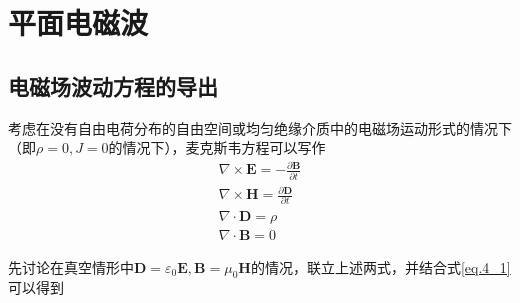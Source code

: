 \section{平面电磁波}
    \subsection{电磁场波动方程的导出}
        考虑在没有自由电荷分布的自由空间或均匀绝缘介质中的电磁场运动形式的情况下（即$\rho=0,J=0$的情况下），麦克斯韦方程可以写作
        \begin{equation}
            \label{eq.4_1}
            \begin{gathered}
            \nabla \times \boldsymbol{E}=-\frac{\partial \mathbf{B}}{\partial t} \\
            \nabla \times \mathbf{H}=\frac{\partial \mathbf{D}}{\partial t} \\
            \nabla \cdot \boldsymbol{D}=\rho \\
            \nabla \cdot \mathbf{B}=0
            \end{gathered}
        \end{equation}

        先讨论在真空情形中$\boldsymbol{D}=\varepsilon_{0} \boldsymbol{E}, \boldsymbol{B}=\mu_{0} \mathbf{H}$的情况，联立上述两式，并结合式\ref{eq.4_1}可以得到
        

        